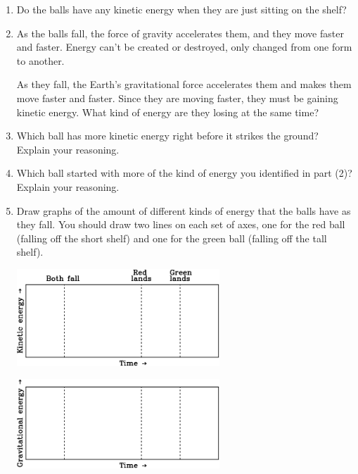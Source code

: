 \documentclass[12pt]{article}
\begin{document}
\begin{enumerate}

\item Do the balls have any kinetic energy when they are just sitting on the shelf?

\vspace{1in}

\newpage

\item 
As the balls fall, the
force of gravity accelerates them, and they move faster and faster. 
Energy can't be created or destroyed, only changed from one form to another. 

As they fall, the Earth's gravitational force accelerates them and makes them move faster and faster.
Since they are moving faster, they must be gaining kinetic energy. What kind of energy are they losing 
at the same time?

\vspace{1.5in}

\item Which ball has more kinetic energy right before it strikes the ground?
Explain your reasoning.

\vspace{1.5in}



\item Which ball started with more of the kind of energy you identified in part (2)? Explain your reasoning.
\newpage
\item Draw graphs of the amount of different kinds of energy that the balls have as they fall. You should
draw two lines on each set of axes, one for the red ball (falling off the short shelf) and one for the green ball (falling off the tall shelf).
\begin{center}

\includegraphics[width=0.6\textwidth]{kinetic-graph-1-crop.pdf}

\includegraphics[width=0.6\textwidth]{gpe-graph-1-crop.pdf}


\end{center}
\end{enumerate}
\end{document}
